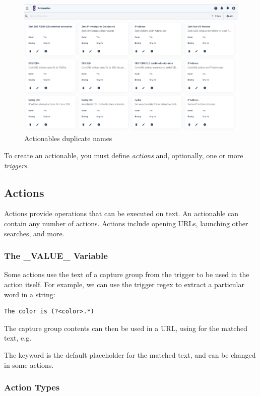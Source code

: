 \begin{figure}
	\includegraphics[width=0.8\linewidth]{images/actionables-menu.png}
	\caption{Actionables duplicate names}
	\label{fig:actionables-menu}
\end{figure}

To create an actionable, you must define \emph{actions} and, optionally, one or more \emph{triggers}.

\subsection{Actions}

Actions provide operations that can be executed on text. An actionable can contain any number of actions. Actions include opening URLs, launching other searches, and more.

\subsubsection{The \_VALUE\_ Variable}

Some actions use the text of a capture group from the trigger to be used in the action itself. For example, we can use the trigger regex to extract a particular word in a string:

\begin{verbatim}
The color is (?<color>.*)
\end{verbatim}

The capture group contents can then be used in a URL, using  for the matched text, e.g. 

The keyword  is the default placeholder for the matched text, and can be changed in some actions.

\subsubsection{Action Types}

